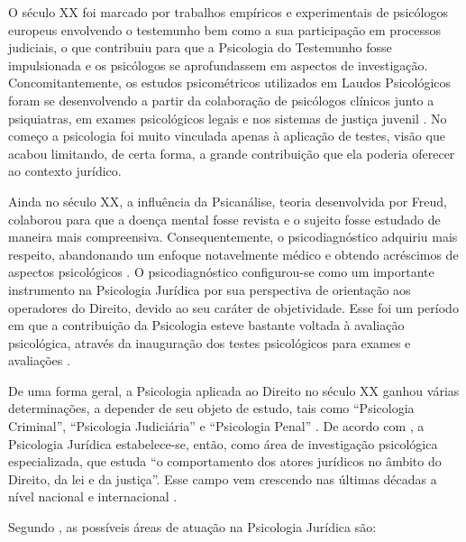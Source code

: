 O século XX foi marcado por trabalhos empíricos e experimentais de psicólogos europeus envolvendo o testemunho bem como a sua participação em processos judiciais, o que contribuiu para que a Psicologia do Testemunho fosse impulsionada e os psicólogos se aprofundassem em aspectos de investigação. Concomitantemente, os estudos psicométricos utilizados em Laudos Psicológicos foram se desenvolvendo a partir da colaboração de psicólogos clínicos junto a psiquiatras, em exames psicológicos legais e nos sistemas de justiça juvenil \cite{JESUS2001}. No começo a psicologia foi muito vinculada apenas à aplicação de testes, visão que acabou limitando, de certa forma, a grande contribuição que ela poderia oferecer ao contexto jurídico.

Ainda no século XX, a influência da Psicanálise, teoria desenvolvida por Freud, colaborou para que a doença mental fosse revista e o sujeito fosse estudado de maneira mais compreensiva. Consequentemente, o psicodiagnóstico adquiriu mais respeito, abandonando um enfoque notavelmente médico e obtendo acréscimos de aspectos psicológicos . O psicodiagnóstico configurou-se como um importante instrumento na Psicologia Jurídica por sua perspectiva de orientação aos operadores do Direito, devido ao seu caráter de objetividade. Esse foi um período em que a contribuição da Psicologia esteve bastante voltada à avaliação psicológica, através da inauguração dos testes psicológicos para exames e avaliações \cite{LAGO2009}.

De uma forma geral, a Psicologia aplicada ao Direito no século XX ganhou várias determinações, a depender de seu objeto de estudo, tais como ``Psicologia Criminal'', ``Psicologia Judiciária'' e ``Psicologia Penal'' \cite[p. 234]{COSTA2009}. De acordo com , a Psicologia Jurídica estabelece-se, então, como área de investigação psicológica especializada, que estuda ``o comportamento dos atores jurídicos no âmbito do Direito, da lei e da justiça''. Esse campo vem crescendo nas últimas décadas a nível nacional e internacional \cite{LEAL2008}.

Segundo , as possíveis áreas de atuação na Psicologia Jurídica são:

